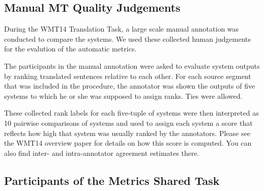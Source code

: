 \subsection{Manual MT Quality Judgements}

During the WMT14 Translation Task, a large scale manual annotation was conducted
to compare the systems. We used these collected human judgements for the evalution
of
the automatic metrics. 

The participants in the manual annotation were asked to evaluate system outputs
by ranking translated sentences relative to each other. For each source segment
that was included in the procedure, the annotator was shown the outputs of five
systems to which he or she was supposed to assign ranks. Ties were allowed.

These collected rank labels for each five-tuple of systems were then interpreted
as 10 pairwise comparisons of systems and  used to assign each system a score
that
reflects how high that system was usually ranked by the annotators. Please see
the WMT14 overview paper for details on how this score is computed. You
can also find inter- and intra-annotator agreement estimates there.


\subsection{Participants of the Metrics Shared Task}

